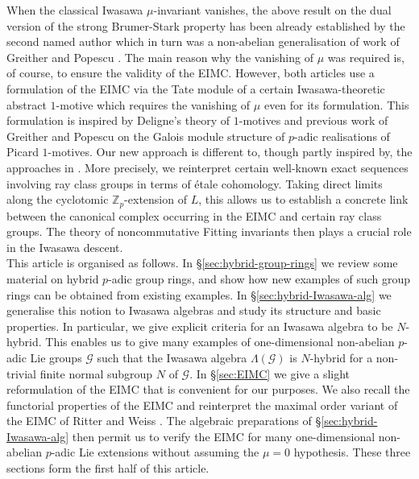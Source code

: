 \documentclass[12pt]{amsart}
\theoremstyle{plain}
\theoremstyle{remark}
\theoremstyle{definition}
\numberwithin{equation}{section}
\begin{document}
When the classical Iwasawa $\mu$-invariant vanishes, the above result on the dual version 
of the strong Brumer-Stark property has been already established by the second named author \cite{MR3072281}
which in turn was a non-abelian generalisation of work of Greither and Popescu \cite{GrP-EIMC}.
The main reason why the vanishing of $\mu$ was required is, of course, to ensure the validity of the EIMC. 
However, both articles use a formulation of the EIMC via the Tate module of a certain Iwasawa-theoretic abstract
$1$-motive which requires the vanishing of $\mu$ even for its formulation. This formulation is inspired by Deligne's theory
of $1$-motives \cite{MR0498552} and previous work of Greither and Popescu \cite{MR2899958}
on the Galois module structure of $p$-adic realisations of Picard $1$-motives.
Our new approach is different to, though partly inspired by, the approaches in \cite{GrP-EIMC, MR3072281}.
More precisely, we reinterpret certain well-known exact sequences involving ray class groups in terms of
\'{e}tale cohomology. Taking direct limits along the cyclotomic ${\mathbb{Z}}_{p}$-extension of $L$,
this allows us to establish a concrete link between the canonical complex
occurring in the EIMC and certain ray class groups. The theory of noncommutative Fitting invariants
then plays a crucial role in the Iwasawa descent.\\

This article is organised as follows. In \S \ref{sec:hybrid-group-rings} we review some material on hybrid
$p$-adic group rings, and show how new examples of such group rings can be obtained from existing examples.
In \S \ref{sec:hybrid-Iwasawa-alg} we generalise this notion to Iwasawa algebras and study its structure and basic properties.
In particular, we give explicit criteria for an Iwasawa algebra to be $N$-hybrid.
This enables us to give many examples of one-dimensional non-abelian $p$-adic Lie groups $\mathcal{G}$
such that the Iwasawa algebra $\Lambda(\mathcal{G})$ is $N$-hybrid for a non-trivial finite normal subgroup
$N$ of $\mathcal{G}$. 
In \S \ref{sec:EIMC} we give a slight reformulation of the EIMC that is convenient for our purposes. 
We also recall the functorial properties of the EIMC and reinterpret the maximal order variant of the EIMC of Ritter and Weiss \cite{MR2114937}.
The algebraic preparations of \S \ref{sec:hybrid-Iwasawa-alg} then permit us to verify the EIMC for many one-dimensional non-abelian
$p$-adic Lie extensions without assuming the $\mu=0$ hypothesis. These three sections form the first half of this article.
\end{document}
